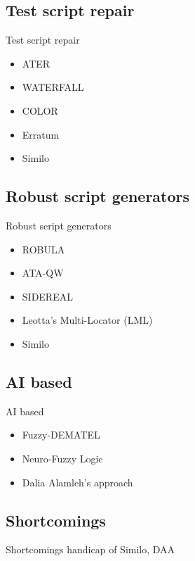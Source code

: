 \documentclass{beamer}
\begin{document}
\subsection{Test script repair}
\begin{frame}{Test script repair}
\begin{itemize}
    \item ATER
    \item WATERFALL
    \item COLOR
    \item Erratum
    \item Similo
\end{itemize}
\end{frame}

\subsection{Robust script generators}
\begin{frame}{Robust script generators}
\begin{itemize}
    \item ROBULA
    \item ATA-QW
    \item SIDEREAL
    \item Leotta's Multi-Locator (LML)
    \item Similo
\end{itemize}
\end{frame}

\subsection{AI based}
\begin{frame}{AI based}
\begin{itemize}
    \item Fuzzy-DEMATEL
    \item Neuro-Fuzzy Logic
    \item Dalia Alamleh's approach
\end{itemize}
\end{frame}

\subsection{Shortcomings}
\begin{frame}{Shortcomings}
handicap of Similo, DAA
\end{frame}
\end{document}
